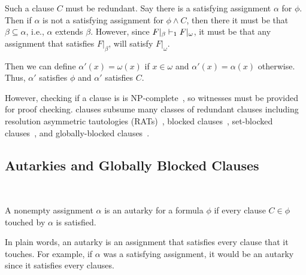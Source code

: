 Such a clause $C$ must be redundant. Say there is a satisfying assignment $\alpha$ for $\phi$. Then if $\alpha$ is not a satisfying assignment for $\phi \land C$, then there it must be that $\beta \subseteq \alpha$, i.e., $\alpha$ extends $\beta$. However, since $F|_\beta \vdash_1 F|_\omega$, it must be that any assignment that satisfies $F|_\beta$, will satisfy $F|_\omega$. 

Then we can define $\alpha' (x) = \omega(x)$ if $x \in \omega$ and $\alpha'(x) = \alpha(x)$ otherwise. Thus, $\alpha'$ satisfies $\phi$ and $\alpha'$ satisfies $C$.




However, checking if a clause is \pr is NP-complete~\cite{prclause}, so witnesses must be provided for proof checking. \pr clauses subsume many classes of redundant clauses including resolution asymmetric tautologies (RATs)~\cite{rat}, blocked clauses~\cite{blockedclause}, set-blocked clauses~\cite{setblocked}, and globally-blocked clauses~\cite{conditionalautarkies}.

\subsection{Autarkies and Globally Blocked Clauses}~\label{subsec:autarkies}


\begin{definition}[Autarky]
    A nonempty assignment $\alpha$ is an autarky for a formula $\phi$ if every clause $C \in \phi$ touched by $\alpha$ is satisfied.
\end{definition}


In plain words, an autarky is an assignment that satisfies every clause that it touches. For example, if $\alpha$ was a satisfying assignment, it would be an autarky since it satisfies every clauses.

